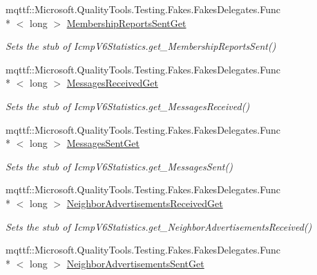 \begin{DoxyCompactItemize}
mqttf\-::\-Microsoft.\-Quality\-Tools.\-Testing.\-Fakes.\-Fakes\-Delegates.\-Func\\*
$<$ long $>$ \hyperlink{class_system_1_1_net_1_1_network_information_1_1_fakes_1_1_stub_icmp_v6_statistics_a52479d8aef10fdeb9190f543687846a4}{Membership\-Reports\-Sent\-Get}
\begin{DoxyCompactList}\small\item\em Sets the stub of Icmp\-V6\-Statistics.\-get\-\_\-\-Membership\-Reports\-Sent()\end{DoxyCompactList}\item 
mqttf\-::\-Microsoft.\-Quality\-Tools.\-Testing.\-Fakes.\-Fakes\-Delegates.\-Func\\*
$<$ long $>$ \hyperlink{class_system_1_1_net_1_1_network_information_1_1_fakes_1_1_stub_icmp_v6_statistics_afe82bb644005f43a39cef770ea74c992}{Messages\-Received\-Get}
\begin{DoxyCompactList}\small\item\em Sets the stub of Icmp\-V6\-Statistics.\-get\-\_\-\-Messages\-Received()\end{DoxyCompactList}\item 
mqttf\-::\-Microsoft.\-Quality\-Tools.\-Testing.\-Fakes.\-Fakes\-Delegates.\-Func\\*
$<$ long $>$ \hyperlink{class_system_1_1_net_1_1_network_information_1_1_fakes_1_1_stub_icmp_v6_statistics_a6de5f3686c488b49e6754fc7da0f5153}{Messages\-Sent\-Get}
\begin{DoxyCompactList}\small\item\em Sets the stub of Icmp\-V6\-Statistics.\-get\-\_\-\-Messages\-Sent()\end{DoxyCompactList}\item 
mqttf\-::\-Microsoft.\-Quality\-Tools.\-Testing.\-Fakes.\-Fakes\-Delegates.\-Func\\*
$<$ long $>$ \hyperlink{class_system_1_1_net_1_1_network_information_1_1_fakes_1_1_stub_icmp_v6_statistics_ad09eee8573b0b19a27e5f04fd1cca28f}{Neighbor\-Advertisements\-Received\-Get}
\begin{DoxyCompactList}\small\item\em Sets the stub of Icmp\-V6\-Statistics.\-get\-\_\-\-Neighbor\-Advertisements\-Received()\end{DoxyCompactList}\item 
mqttf\-::\-Microsoft.\-Quality\-Tools.\-Testing.\-Fakes.\-Fakes\-Delegates.\-Func\\*
$<$ long $>$ \hyperlink{class_system_1_1_net_1_1_network_information_1_1_fakes_1_1_stub_icmp_v6_statistics_a9d903d68b2a3b85beff93a072d8d3794}{Neighbor\-Advertisements\-Sent\-Get}

\end{DoxyCompactItemize}
